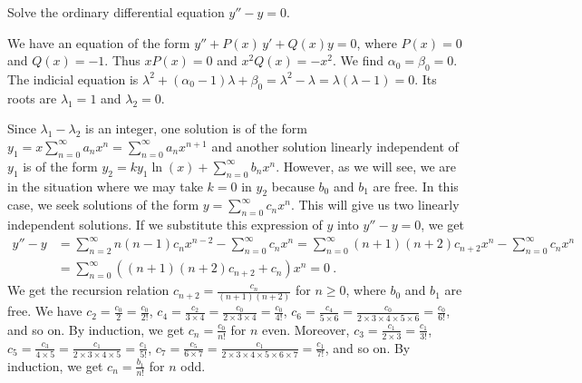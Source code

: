 \begin{egg}
Solve the ordinary differential equation $\displaystyle y''- y = 0$.

We have an equation of the form
$\displaystyle y'' + P(x)\, y' + Q(x) y = 0$, where
$\displaystyle P(x) = 0$ and $\displaystyle Q(x) = -1$.
Thus $\displaystyle x P(x) = 0$ and
$\displaystyle x^2 Q(x) = -x^2$.  We find $\alpha_0 = \beta_0= 0$.
The indicial equation is
$\displaystyle \lambda^2 + (\alpha_0 - 1) \lambda + \beta_0 =
\lambda^2 - \lambda = \lambda(\lambda -1) = 0$.
Its roots are $\displaystyle \lambda_1 = 1$ and $\lambda_2=0$.

Since $\lambda_1-\lambda_2$ is an integer, one solution is of the form
$\displaystyle y_1 = x \sum_{n=0}^\infty a_n x^n = \sum_{n=0}^\infty a_n x^{n+1}$
and another solution linearly independent of $y_1$ is of the form
$\displaystyle y_2 = k y_1 \ln(x) + \sum_{n=0}^\infty b_n x^n$.
However, as we will see, we are in the situation where we may take
$k=0$ in $y_2$ because $b_0$ and $b_1$ are free.  In this case, we
seek solutions of the form
$\displaystyle y = \sum_{n=0}^\infty c_n x^n$.
This will give us two linearly independent solutions.
If we substitute this expression of $y$ into $\displaystyle y''- y = 0$,
we get 
\begin{align*}
y''- y & = \sum_{n=2}^\infty n(n-1) c_n x^{n-2} - \sum_{n=0}^\infty c_n x^n
= \sum_{n=0}^\infty (n+1)(n+2) c_{n+2} x^n - \sum_{n=0}^\infty c_n x^n \\
&= \sum_{n=0}^\infty \left( (n+1)(n+2)c_{n+2} + c_n\right) x^n = 0 \  .
\end{align*}
We get the recursion relation
$\displaystyle c_{n+2} = \frac{c_n}{(n+1)(n+2)}$
for $n \geq 0$, where $b_0$ and $b_1$ are free.  We have
$\displaystyle c_2 = \frac{c_0}{2} = \frac{c_0}{2!}$,
$\displaystyle c_4 = \frac{c_2}{3\times 4} = \frac{c_0}{2\times 3 \times 4} 
= \frac{c_0}{4!}$,
$\displaystyle c_6 = \frac{c_4}{5\times 6} = \frac{c_0}{2\times 3
\times 4 \times 5 \times 6} = \frac{c_0}{6!}$, and so on.
By induction, we get $\displaystyle c_n = \frac{c_0}{n!}$ for $n$ even.
Moreover,
$\displaystyle c_3 = \frac{c_1}{2\times 3} = \frac{c_1}{3!}$,
$\displaystyle c_5 = \frac{c_3}{4\times 5} = \frac{c_1}{2\times
3\times 4 \times 5} = \frac{c_1}{5!}$,
$\displaystyle c_7 = \frac{c_5}{6\times 7} = \frac{c_1}{2\times
3\times 4 \times 5 \times 6 \times 7} = \frac{c_1}{7!}$, and so on.
By induction, we get
$\displaystyle c_n = \frac{b_1}{n!}$ for $n$ odd.


\end{egg}
